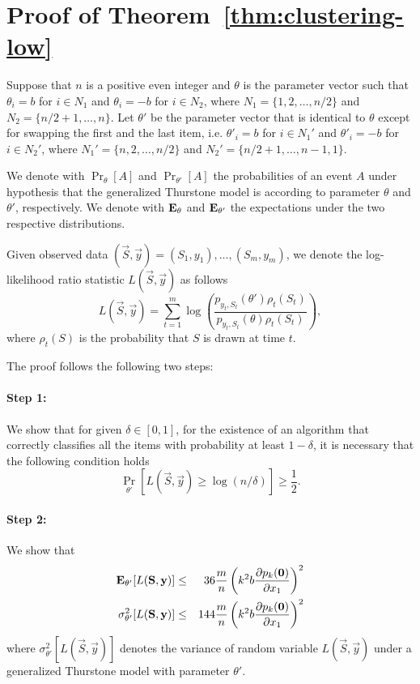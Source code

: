 \section{Proof of Theorem~\ref{thm:clustering-low}}
\label{sec:clustering-low}

Suppose that $n$ is a positive even integer and $\theta$ is the parameter vector such that $\theta_i =b$ for $i\in N_1$ and $\theta_i = -b$ for $i \in N_2$, where $N_1 =\{1,2,\ldots,n/2\}$ and $N_2 = \{n/2+1,\ldots,n\}$. Let $\theta'$ be the parameter vector that is identical to $\theta$ except for swapping the first and the last item, i.e. $\theta'_i = b$ for $i\in N_1'$ and $\theta'_i = -b$ for $i\in N_2'$, where $N_1' = \{n,2,\ldots,n/2\}$ and $N_2'=\{n/2+1,\ldots,n-1,1\}$. 

We denote with $\Pr_\theta[A]$ and $\Pr_{\theta'}[A]$ the probabilities of an event $A$ under hypothesis that the generalized Thurstone model is according to parameter $\theta$ and $\theta'$, respectively. We denote with $\mathbf{E}_\theta$ and $\mathbf{E}_{\theta'}$ the expectations under the two respective distributions. 

Given observed data $(\vec{S},\vec{y}) = (S_1,y_1), \ldots, (S_m,y_m)$, we denote the log-likelihood ratio statistic $L(\vec{S},\vec{y})$ as follows
\begin{equation}
L(\vec{S},\vec{y}) = \sum_{t=1}^{m}\log\left(\frac{p_{y_t,S_t}(\theta')\rho_t(S_t)}{p_{y_t,S_t}(\theta)\rho_t(S_t)}\right),
\end{equation}
where $\rho_t (S)$ is the probability that $S$ is drawn at time $t$.

The proof follows the following two steps:

\paragraph{Step 1:} We show that for given $\delta \in [0,1]$, for the existence of an algorithm that correctly classifies all the items with probability at least $1-\delta$, it is necessary that the following condition holds
\begin{equation}
\Pr_{\theta'}[L(\vec{S},\vec{y}) \ge \log(n/\delta)] \ge \frac{1}{2}.
\label{equ:plrt}
\end{equation}

\paragraph{Step 2:} We show that 
\begin{eqnarray}
\mathbf{E}_{\theta'}[L(\mathbf{S},\mathbf{y})] &\le& 36\frac{m}{n}\left(k^2b\frac{\partial p_k ({\bm 0})}{\partial x_1}\right)^2 \label{equ:el}\\
\sigma^2_{\theta'}[L(\mathbf{S},\mathbf{y})] &\le& 144\frac{m}{n}\left(k^2b\frac{\partial p_k ({\bm 0})}{\partial x_1}\right)^2\label{equ:varl}
\end{eqnarray}
where $\sigma^2_{\theta'}[L(\vec{S},\vec{y})]$ denotes the variance of random variable $L(\vec{S},\vec{y})$ under a generalized Thurstone model with parameter $\theta'$.

